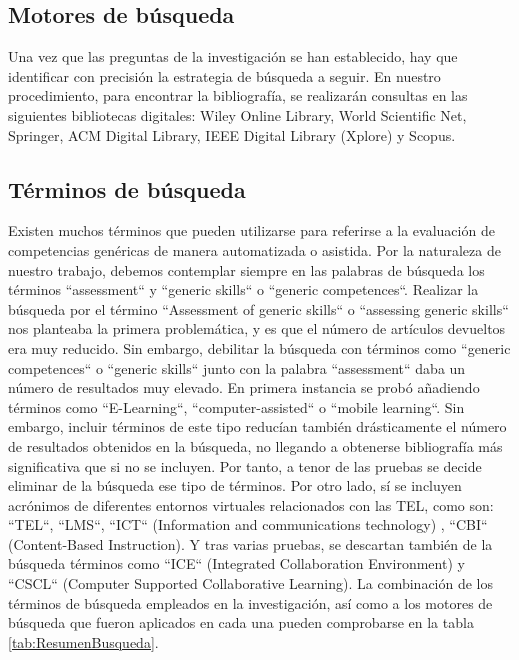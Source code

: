 \subsection{Motores de búsqueda}
Una vez que las preguntas de la investigación se han establecido, hay que identificar con precisión la estrategia de búsqueda a seguir. En nuestro procedimiento, para encontrar la bibliografía, se realizarán consultas en las siguientes bibliotecas digitales: Wiley Online Library, World Scientific Net, Springer, ACM Digital Library, IEEE Digital Library (Xplore) y Scopus.

\subsection{Términos de búsqueda}
\label{sec:TerminosBusqueda}
Existen muchos términos que pueden utilizarse para referirse a la evaluación de competencias genéricas de manera automatizada o asistida. Por la naturaleza de nuestro trabajo, debemos contemplar siempre en las palabras de búsqueda los términos ``assessment`` y ``generic skills`` o ``generic competences``. Realizar la búsqueda por el término ``Assessment of generic skills`` o ``assessing generic skills`` nos planteaba la primera problemática, y es que el número de artículos devueltos era muy reducido. Sin embargo, debilitar la búsqueda con términos como ``generic competences`` o ``generic skills`` junto con la palabra ``assessment`` daba un número de resultados muy elevado. En primera instancia se probó añadiendo términos como  ``E-Learning``, ``computer-assisted`` o ``mobile learning``. Sin embargo, incluir términos de este tipo reducían también drásticamente el número de resultados obtenidos en la búsqueda, no llegando a obtenerse bibliografía más significativa que si no se incluyen. Por tanto, a tenor de las pruebas se decide eliminar de la búsqueda ese tipo de términos. Por otro lado, sí se incluyen acrónimos de diferentes entornos virtuales relacionados con las TEL, como son: ``TEL``, ``LMS``, ``ICT`` (Information and communications technology) , ``CBI`` (Content-Based Instruction). Y tras varias pruebas, se descartan también de la búsqueda términos como ``ICE`` (Integrated Collaboration Environment) y ``CSCL`` (Computer Supported Collaborative Learning). La combinación de los términos de búsqueda empleados en la investigación, así como a los motores de búsqueda que fueron aplicados en cada una pueden comprobarse en la tabla \ref{tab:ResumenBusqueda}.

